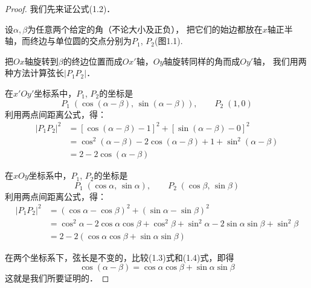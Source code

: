\begin{proof}
我们先来证公式(1.2)．

设$\alpha,\beta$为任意两个给定的角（不论大小及正负），
把它们的始边都放在$x$轴正半轴，而终边与单位圆的交点分别为$P_1$, $P_2$(图1.1).

\begin{figure}[htp]
    \centering
    \caption{}
\end{figure}

把$Ox$轴旋转到$\beta$的终边位置而成$Ox'$轴，$Oy$轴旋转同样的角而成$Oy'$轴，
我们用两种方法计算弦长$|P_1P_2|$．

在$x'Oy'$坐标系中，$P_1$, $P_2$的坐标是
\[P_1\; \left(\cos(\alpha-\beta),\, \sin(\alpha-\beta)\right),\qquad P_2\; (1,0) \]
利用两点间距离公式，得：
\begin{equation}
\begin{split}
|P_1P_2|^2 &=\left[\cos(\alpha-\beta)-1\right]^2+\left[\sin(\alpha-\beta)-0\right]^2\\
&=\cos^2(\alpha-\beta)-2\cos(\alpha-\beta)+1+\sin^2(\alpha-\beta)\\
&=2-2\cos (\alpha-\beta)
\end{split}
\end{equation}

在$xOy$坐标系中，$P_1$, $P_2$的坐标是
\[P_1\;(\cos\alpha,\, \sin\alpha),\qquad  P_2\; (\cos\beta,\, \sin\beta)\]
利用两点间距离公式，得：
\begin{equation}
    \begin{split}
    |P_1P_2|^2 &=(\cos\alpha-\cos\beta)^2+(\sin\alpha-\sin\beta)^2\\
    &=\cos^2\alpha-2\cos\alpha\cos\beta+\cos^2\beta +\sin^2\alpha-2\sin\alpha\sin\beta+\sin^2\beta\\
    &=2-2(\cos\alpha\cos\beta+\sin\alpha\sin\beta)
    \end{split}
    \end{equation}

    在两个坐标系下，弦长是不变的，比较(1.3)式和(1.4)式，即得
   \[ \cos (\alpha-\beta) =\cos\alpha\cos\beta+\sin\alpha\sin\beta\]
    这就是我们所要证明的．
\end{proof}

